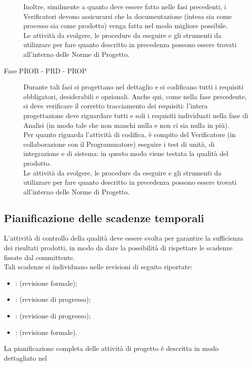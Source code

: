 \begin{description}
			Inoltre, similmente a quanto deve essere fatto nelle fasi precedenti, i Verificatori devono assicurarsi che la documentazione (intesa sia 
			come processo sia come prodotto) venga fatta nel modo migliore possibile.\\
			Le attività da svolgere, le procedure da eseguire e gli strumenti da utilizzare per fare quanto descritto in precedenza possono essere trovati 
			all'interno delle Norme di Progetto.
			\item[Fase PROB - PRD - PROP] Durante tali fasi si progettano nel dettaglio e si codificano tutti i requisiti obbligatori, desiderabili e 
			opzionali. Anche qui, come nella fase precedente, si deve verificare il corretto tracciamento dei requisiti: l'intera progettazione deve 
			riguardare tutti e soli i requisiti individuati nella fase di Analisi (in modo tale che non manchi nulla e non ci sia nulla in più).\\
			Per quanto riguarda l'attività di codifica, è compito del Verificatore (in collaborazione con il Programmatore) eseguire i test di unità, di 
			integrazione e di sistema: in questo modo viene testata la qualità del prodotto.\\
			Le attività da svolgere, le procedure da eseguire e gli strumenti da utilizzare per fare quanto descritto in precedenza possono essere trovati 
			all'interno delle Norme di Progetto.
		\end{description}
		\subsection{Pianificazione delle scadenze temporali}
			L'attività di controllo della qualità deve essere svolta per garantire la sufficienza dei risultati prodotti, in modo da dare la possibilità di rispettare le scadenze fissate dal committente.\\
			Tali scadenze si individuano nelle revisioni di seguito riportate:
			\begin{itemize}
				\item {}:  (revisione formale);
				\item {}:  (revisione di progresso);
				\item {}:  (revisione di progresso);
				\item {}:  (revisione formale).
			\end{itemize}
			La pianificazione completa delle attività di progetto è descritta in modo dettagliato nel 
